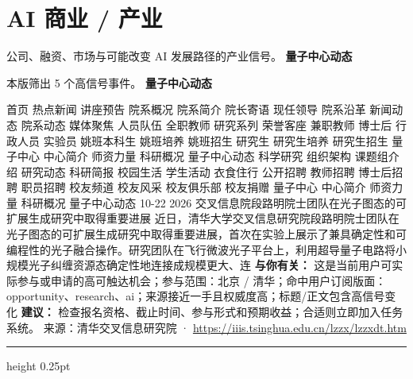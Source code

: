 \documentclass[10.5pt]{ctexart}
\begin{document}
\section*{AI 商业 / 产业}
{\color{ormuted} 公司、融资、市场与可能改变 AI 发展路径的产业信号。}
\vspace{2mm}
{\LARGE\bfseries 量子中心动态}\par
\vspace{1mm}
{\color{ormuted} 本版筛出 5 个高信号事件。}
\vspace{3mm}
{\Large\bfseries 量子中心动态}\par
首页 热点新闻 讲座预告 院系概况 院系简介 院长寄语 现任领导 院系沿革 新闻动态 院系动态 媒体聚焦 人员队伍 全职教师 研究系列 荣誉客座 兼职教师 博士后 行政人员 实验员 姚班本科生 姚班培养 姚班招生 研究生 研究生培养 研究生招生 量子中心 中心简介 师资力量 科研概况 量子中心动态 科学研究 组织架构 课题组介绍 研究动态 科研简报 校园生活 学生活动 衣食住行 公开招聘 教师招聘 博士后招聘 职员招聘 校友频道 校友风采 校友俱乐部 校友捐赠 量子中心 中心简介 师资力量 科研概况 量子中心动态 10-22 2026 交叉信息院段路明院士团队在光子图态的可扩展生成研究中取得重要进展 近日，清华大学交叉信息研究院段路明院士团队在光子图态的可扩展生成研究中取得重要进展，首次在实验上展示了兼具确定性和可编程性的光子融合操作。研究团队在飞行微波光子平台上，利用超导量子电路将小规模光子纠缠资源态确定性地连接成规模更大、连
\textbf{与你有关：} 这是当前用户可实际参与或申请的高可触达机会；参与范围：北京 / 清华；命中用户订阅版面：opportunity、research、ai；来源接近一手且权威度高；标题/正文包含高信号变化
\textbf{建议：} 检查报名资格、截止时间、参与形式和预期收益；合适则立即加入任务系统。
{\footnotesize\color{ormuted} 来源：清华交叉信息研究院 · \url{https://iiis.tsinghua.edu.cn/lzzx/lzzxdt.htm}}
\vspace{4mm}
\hrule height 0.25pt
\vspace{3mm}
\end{document}
